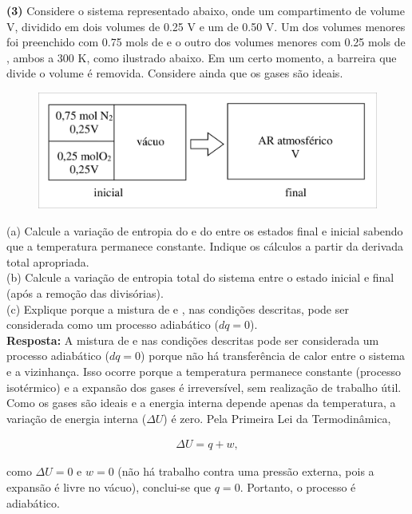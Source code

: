 \textbf{(3)} Considere o sistema representado abaixo, onde um compartimento de
volume V, dividido em dois volumes de \num{0,25} V e um de \num{0,50} V. Um dos volumes
menores foi preenchido com \num{0,75} mols de  e o outro dos volumes menores com
\num{0,25} mols de , ambos a 300 K, como ilustrado abaixo. Em um certo momento, a
barreira que divide o volume é removida.  Considere ainda que os gases são
ideais.\\

\begin{figure}[H]
    \centering
    \includegraphics[width=.8\linewidth]{Q3.png}
\end{figure}

(a) Calcule a variação de entropia do  e do  entre os estados
final e inicial sabendo que a temperatura permanece constante. Indique os
cálculos a partir da derivada total apropriada.\\

(b) Calcule a variação de entropia total do sistema entre o estado inicial e
final (após a remoção das divisórias).\\

(c) Explique porque a mistura de  e , nas condições descritas,
pode ser considerada como um processo adiabático (\(dq= 0\)).\\

    \textbf{Resposta:} A mistura de  e  nas condições descritas pode 
    ser considerada um processo adiabático (\(dq = 0\)) porque não há transferência 
    de calor entre o sistema e a vizinhança. Isso ocorre porque a temperatura 
    permanece constante (processo isotérmico) e a expansão dos gases é irreversível, 
    sem realização de trabalho útil. Como os gases são ideais e a energia interna 
    depende apenas da temperatura, a variação de energia interna (\(\Delta U\)) é zero. 
    Pela Primeira Lei da Termodinâmica,

    \begin{align*}
    \Delta U = q + w,
    \end{align*}

    como \(\Delta U = 0\) e \(w = 0\) (não há trabalho contra uma pressão externa, 
    pois a expansão é livre no vácuo), conclui-se que \(q = 0\). Portanto, o processo 
    é adiabático. 

